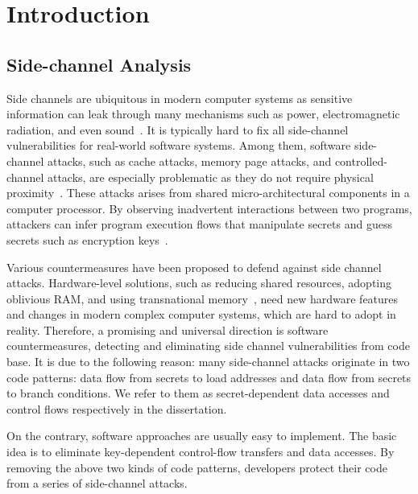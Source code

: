 
\chapter{Introduction} \label{chapter1}
\section{Side-channel Analysis}
Side channels are ubiquitous in modern computer systems as sensitive
information can leak through many mechanisms such as power,
electromagnetic radiation, and even sound~\cite{agrawal2002side,kar20178,chari1999towards,217605,genkin2014rsa}.
It is typically hard to fix all side-channel vulnerabilities for real-world software systems. Among them, software side-channel attacks, such as cache attacks, memory page attacks, and controlled-channel attacks, are especially problematic as they do not require physical proximity~\cite{7163052,217543,217589,lee2017inferring,191010,liu2015last}. These attacks arises from shared micro-architectural components in a computer processor. By observing inadvertent interactions between two programs, attackers can infer program execution flows that manipulate secrets and guess secrets such as encryption keys~\cite{Osvik2006,Gullasch:2011:CGB:2006077.2006784,203878,10.1007/978-3-540-45238-6_6}.

Various countermeasures have been proposed to defend against
side channel attacks. Hardware-level solutions, such as reducing shared
resources, adopting oblivious RAM, and using transnational
memory~\cite{203878,217537,shih2017t,Zhang:2015:HDL:2775054.2694372}, need new
hardware features and changes in modern complex computer systems, which are
hard to adopt in reality. Therefore, a promising and universal direction is software countermeasures, detecting and eliminating side channel vulnerabilities from code base. It is due to the following reason: many side-channel attacks originate in two code patterns: data flow from secrets to load addresses and data flow from secrets to branch conditions. We refer to them as secret-dependent data accesses and control flows respectively in the dissertation. 

On the contrary, software approaches are
usually easy to implement. The basic idea is to eliminate key-dependent
control-flow transfers and data accesses. By removing the above two kinds of code patterns, developers protect their 
code from a series of side-channel attacks.

